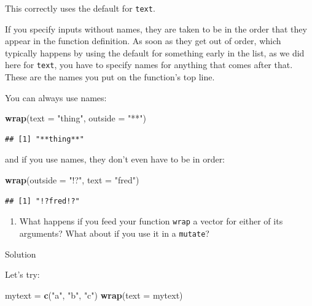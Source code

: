 \documentclass[]{tufte-book}
\newenvironment{Shaded}{}{}
\newcommand{\DataTypeTok}[1]{\textcolor[rgb]{0.56,0.13,0.00}{#1}}
\newcommand{\KeywordTok}[1]{\textcolor[rgb]{0.00,0.44,0.13}{\textbf{#1}}}
\newcommand{\NormalTok}[1]{#1}
\newcommand{\StringTok}[1]{\textcolor[rgb]{0.25,0.44,0.63}{#1}}
\providecommand{\tightlist}{%
  \setlength{\itemsep}{0pt}\setlength{\parskip}{0pt}}
\theoremstyle{definition}
\theoremstyle{definition}
\theoremstyle{definition}
\theoremstyle{remark}
\begin{document}
This correctly uses the default for \texttt{text}.

If you specify inputs without names, they are taken to be in the order
that they appear in the function definition. As soon as they get out of
order, which typically happens by using the default for something early
in the list, as we did here for \texttt{text}, you have to specify names
for anything that comes after that. These are the names you put on the
function's top line.

You can always use names:

\begin{Shaded}
\begin{Highlighting}[]
\KeywordTok{wrap}\NormalTok{(}\DataTypeTok{text =} \StringTok{"thing"}\NormalTok{, }\DataTypeTok{outside =} \StringTok{"**"}\NormalTok{)}
\end{Highlighting}
\end{Shaded}

\begin{verbatim}
## [1] "**thing**"
\end{verbatim}

and if you use names, they don't even have to be in order:

\begin{Shaded}
\begin{Highlighting}[]
\KeywordTok{wrap}\NormalTok{(}\DataTypeTok{outside =} \StringTok{"!?"}\NormalTok{, }\DataTypeTok{text =} \StringTok{"fred"}\NormalTok{)}
\end{Highlighting}
\end{Shaded}

\begin{verbatim}
## [1] "!?fred!?"
\end{verbatim}

\begin{enumerate}
\def\labelenumi{(\alph{enumi})}
\setcounter{enumi}{7}
\tightlist
\item
  What happens if you feed your function \texttt{wrap} a vector for
  either of its arguments? What about if you use it in a
  \texttt{mutate}?
\end{enumerate}

Solution

Let's try:

\begin{Shaded}
\begin{Highlighting}[]
\NormalTok{mytext =}\StringTok{ }\KeywordTok{c}\NormalTok{(}\StringTok{"a"}\NormalTok{, }\StringTok{"b"}\NormalTok{, }\StringTok{"c"}\NormalTok{)}
\KeywordTok{wrap}\NormalTok{(}\DataTypeTok{text =}\NormalTok{ mytext)}
\end{Highlighting}
\end{Shaded}
\end{document}
